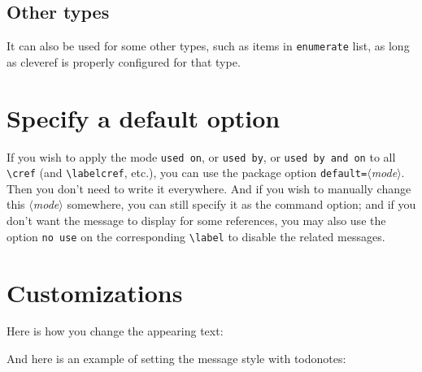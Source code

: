 \documentclass[
    use style = plain,
    title in boldface,
    emphasize theorems,
    simple name, %
    name in link,
]{einfart}
\newcommand{\meta}[1]{$\langle${\normalfont\itshape#1}$\rangle$}
\newcommand{\packageoption}[1]{\textcolor{code-option}{\texttt{#1}}}
\newcommand{\commandoption}[1]{\textcolor{code-keys}{\texttt{#1}}}
\begin{document}
\subsection{Other types}

It can also be used for some other types, such as items in \texttt{enumerate} list, as long as \textsf{cleveref} is properly configured for that type.

\section{Specify a default option}

If you wish to apply the mode \commandoption{used on}, or \commandoption{used by}, or \commandoption{used by and on} to all \lstinline|\cref| (and \lstinline|\labelcref|, etc.), you can use the package option \packageoption{default=}\meta{mode}. Then you don't need to write it everywhere. And if you wish to manually change this \meta{mode} somewhere, you can still specify it as the command option; and if you don't want the message to display for some references, you may also use the option \commandoption{no use} on the corresponding \lstinline|\label| to disable the related messages.


\section{Customizations}

\begingroup

Here is how you change the appearing text:

\begin{code}
\end{code}


\bigskip
And here is an example of setting the message style with \textsf{todonotes}:

\begin{code}
\SetForwardReferenceStyle
  {%
  }
\SetForwardReferenceStyleOutsideMath
  {%
  }
\end{code}
\end{document}
